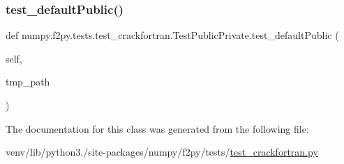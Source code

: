 \mbox{\label{classnumpy_1_1f2py_1_1tests_1_1test__crackfortran_1_1TestPublicPrivate_a10ce9571f403ebfd3b67546d8a0ba7b4}} 
\subsubsection{\texorpdfstring{test\+\_\+default\+Public()}{test\_defaultPublic()}}
{\footnotesize\ttfamily def numpy.\+f2py.\+tests.\+test\+\_\+crackfortran.\+Test\+Public\+Private.\+test\+\_\+default\+Public (\begin{DoxyParamCaption}\item[{}]{self,  }\item[{}]{tmp\+\_\+path }\end{DoxyParamCaption})}



The documentation for this class was generated from the following file\+:\begin{DoxyCompactItemize}
\item 
venv/lib/python3./site-\/packages/numpy/f2py/tests/\hyperlink{test__crackfortran_8py}{test\+\_\+crackfortran.\+py}\end{DoxyCompactItemize}
